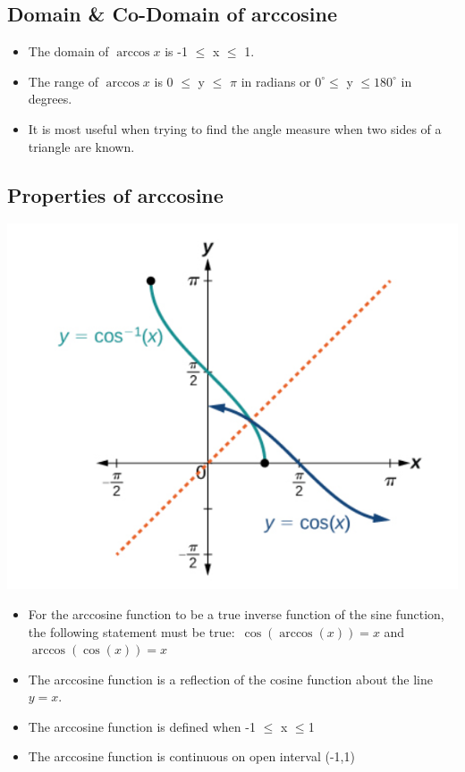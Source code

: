 \documentclass[a4paper,10pt]{report}
\begin{document}
\subsection{Domain \& Co-Domain of arccosine}
\begin{itemize}[noitemsep]
\item The domain of $\arccos x $ is  -1 $\leq$ x $\leq$ 1.
\item The range of $\arccos x $ is  0 $\leq$ y $\leq$ $\pi$ in radians or $0^{\circ}$$\leq$ y $\leq$$180^{\circ}$ in degrees.
\item It is most useful when trying to find the angle measure when two sides of a triangle are known.
\end{itemize}

\subsection{Properties of arccosine}
    \begin{minipage}{0.40\textwidth}
    \centering
    \includegraphics[width=\textwidth]{Capturelast.PNG}
    \end{minipage}
    \begin{minipage}{0.60\textwidth}
    \begin{itemize}[noitemsep]
      \item For the arccosine function to be a true inverse function of the sine function, the following statement must be true$\colon$ $\cos(\arccos(x))=x$ and $\arccos(\cos(x))=x$
      \item The arccosine function is a reflection of the cosine function about the line $y=x$.
      \item The arccosine function is defined when -1 $\leq$ x $\leq$1
      \item The arccosine function is continuous on open interval (-1,1)
      
    \end{itemize}
    \end{minipage}
\end{document}
